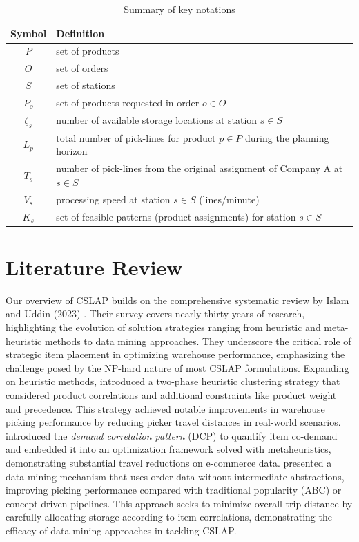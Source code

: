 \documentclass[11pt]{elsarticle}
\begin{document}
\begin{table}[htbp]
\centering
\small %
\begin{tabular}{cl}
\toprule
\textbf{Symbol} & \textbf{Definition}\\
\midrule
$P$ & set of products\\
$O$ & set of orders\\
$S$ & set of stations\\
$P_o$ & set of products requested in order $o \in O$\\
$\zeta_s$ & number of available storage locations at station $s \in S$\\
$L_p$ & total number of pick-lines for product $p \in P$ during the planning horizon\\
$T_s$ & number of pick-lines from the original assignment of Company A at $s \in S$\\
$V_s$ & processing speed at station $s \in S$ (lines/minute)\\
$K_s$ & set of feasible patterns (product assignments) for station $s \in S$\\

\bottomrule
\end{tabular}
\caption*{Summary of key notations}
\label{tab:notation}
\end{table}




\section{Literature Review}\label{sec:lit_review}
Our overview of CSLAP builds on the comprehensive systematic review by Islam and Uddin (2023) \cite{islam2023}. Their survey covers nearly thirty years of research, highlighting the evolution of solution strategies ranging from heuristic and meta-heuristic methods to data mining approaches. They underscore the critical role of strategic item placement in optimizing warehouse performance, emphasizing the challenge posed by the NP-hard nature of most CSLAP formulations.
Expanding on heuristic methods, \cite{trindade2022} introduced a two-phase heuristic clustering strategy that considered product correlations and additional constraints like product weight and precedence. This strategy achieved notable improvements in warehouse picking performance by reducing picker travel distances in real-world scenarios. \citet{zhang2019cie} introduced the \emph{demand correlation pattern} (DCP) to quantify item co-demand and embedded it into an optimization framework solved with metaheuristics, demonstrating substantial travel reductions on e-commerce data.\cite{wang2020} presented a data mining mechanism that uses order data without intermediate abstractions, improving picking performance compared with traditional popularity (ABC) or concept-driven pipelines. This approach seeks to minimize overall trip distance by carefully allocating storage according to item correlations, demonstrating the efficacy of data mining approaches in tackling CSLAP.
\end{document}
